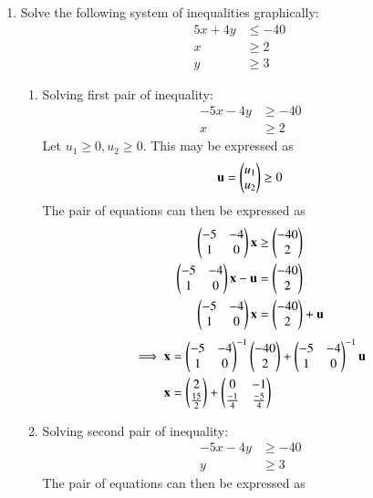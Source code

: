 \documentclass[journal,12pt,twocolumn]{IEEEtran}
\renewcommand\thesection{\arabic{section}}
\begin{document}
\begin{enumerate}[label=\thesection.\arabic*.,ref=\thesection.\theenumi]
\item 
Solve the following system of inequalities graphically:
\begin{align}
    5x+4y&\leq-40\\
    x&\geq2\\
    y&\geq3
\end{align}
\solution
\begin{enumerate}
    \item Solving first pair of inequality:
    \begin{align}
        -5x-4y&\geq-40\\
        x&\geq2
    \end{align}
Let $u_1\geq0, u_2\geq0$. This may be expressed as 
\begin{align}
    \mathbf{u}=\begin{pmatrix}u_1\\u_2\end{pmatrix}\geq0
\end{align}
The pair of equations can then be expressed as
\begin{align}
    \begin{pmatrix}-5&-4\\1&0\end{pmatrix}\mathbf{x}&\geq\begin{pmatrix}-40\\2\end{pmatrix}\\
    \begin{pmatrix}-5&-4\\1&0\end{pmatrix}\mathbf{x}-\mathbf{u}&=\begin{pmatrix}-40\\2\end{pmatrix}\\
    \begin{pmatrix}-5&-4\\1&0\end{pmatrix}\mathbf{x}&=\begin{pmatrix}-40\\2\end{pmatrix}+\mathbf{u}
    \end{align}
    \begin{align}
        \implies \mathbf{x}&=\begin{pmatrix}-5&-4\\1&0\end{pmatrix}^{-1}\begin{pmatrix}-40\\2\end{pmatrix}+\begin{pmatrix}-5&-4\\1&0\end{pmatrix}^{-1}\mathbf{u}\\
        \mathbf{x}&=\begin{pmatrix}2\\\frac{15}{2}\end{pmatrix}+\begin{pmatrix}0&-1\\\frac{-1}{4}&\frac{-5}{4}\end{pmatrix}\label{eq1}
    \end{align}
    \item Solving second pair of inequality:
    \begin{align}
        -5x-4y&\geq-40\\
        y&\geq3
    \end{align}
The pair of equations can then be expressed as
\begin{align}

\end{align}
\end{enumerate}
\end{enumerate}
\end{document}

